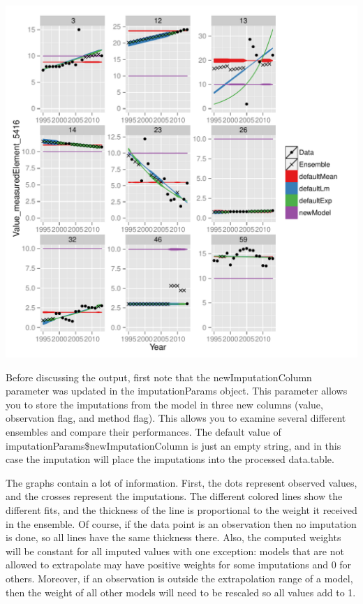 \documentclass[nojss]{jss}
\begin{document}
\begin{knitrout}
{\centering \includegraphics[width=\maxwidth]{figure/impute-yield-1} 

}



\end{knitrout}

Before discussing the output, first note that the newImputationColumn parameter
was updated in the imputationParams object.  This parameter allows you to store
the imputations from the model in three new columns (value, observation flag,
and method flag).  This allows you to examine several different ensembles and
compare their performances.  The default value of
imputationParams\$newImputationColumn is just an empty string, and in this case
the imputation will place the imputations into the processed data.table.

The graphs contain a lot of information.  First, the dots represent observed
values, and the crosses represent the imputations.  The different colored lines
show the different fits, and the thickness of the line is proportional to the
weight it received in the ensemble.  Of course, if the data point is an
observation then no imputation is done, so all lines have the same thickness
there.  Also, the computed weights will be constant for all imputed values with
one exception: models that are not allowed to extrapolate may have positive
weights for some imputations and 0 for others.  Moreover, if an observation
is outside the extrapolation range of a model, then the weight of all other
models will need to be rescaled so all values add to 1.
\end{document}
